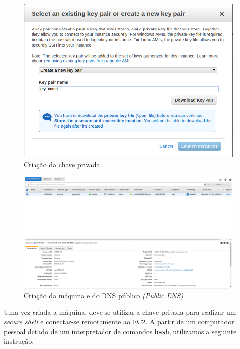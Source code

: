 \begin{figure}[htp]
    \begin{center}
    \includegraphics[width=1\textwidth]{img/aws_setup_keypair}
    \end{center}
    \caption{Criação da chave privada}
    \label{fig:aws_setup_keypair}
\end{figure}

\begin{figure}[htp]
    \begin{center}
    \includegraphics[width=1\textwidth]{img/aws_setup_dns}
    \end{center}
    \caption{Criação da máquina e do DNS público \textit{(Public DNS)}}
    \label{fig:aws_setup_dns}
\end{figure}



Uma vez criada a máquina, deve-se utilizar a chave privada para realizar um \textit{secure shell} e conectar-se remotamente ao EC2. A partir de um computador pessoal dotado de um interpretador de comandos \texttt{bash}, utilizamos a seguinte instrução:

